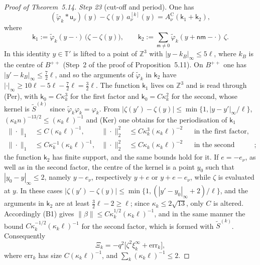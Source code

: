 \documentclass[11pt,letterpaper,reqno]{amsart}
\theoremstyle{definition}
\begin{document}
\begin{proof}[Proof of Theorem~5.14]
\emph{Step 23} (cut-off and period).
One has
\begin{equation*}
(\tilde\varphi_k*\mathsf u_\nu)(y)-\zeta(y)\,a^{[k]}_\nu(y)=A^{\mathrm C}_\nu(\mathsf k_1+\mathsf k_2),
\end{equation*}
where
\begin{equation*}
\mathsf k_1:=\tilde\varphi_k(y-\cdot)\,\bigl(\zeta-\zeta(y)\bigr),\qquad\mathsf k_2:=\sum_{\mathsf m\ne0}\tilde\varphi_k(y+\mathsf n\mathsf m-\cdot)\,\zeta.
\end{equation*}
In this identity $y\in\mathbb T'$ is lifted to a point of $\mathbb Z^3$ with $|y-k_B|_\infty\le5\ell$, where $k_B$ is the centre of $B^{++}$ (Step~2 of the proof of Proposition~5.11).
On $B^{++}$ one has $|y'-k_B|_\infty\le\frac72\ell$, and so the arguments of $\tilde\varphi_k$ in $\mathsf k_2$ have $|\cdot|_\infty\ge10\ell-5\ell-\frac72\ell=\frac32\ell$.
The function $\mathsf k_1$ lives on $\mathbb Z^3$ and is read through (Per), with $\mathsf k_0=C\kappa_k^3$ for the first factor and $\mathsf k_0=C\kappa_k^2$ for the second, whose kernel is $\tilde S^{(k)}$ since $\tilde\varphi_k\varphi_k=\varphi_k$.
From $|\zeta(y')-\zeta(y)|\le\min\{1,|y-y'|_\infty/\ell\}$, $(\kappa_kn)^{-13/2}\le(\kappa_k\ell)^{-1}$ and (Ker) one obtains for the periodisation of $\mathsf k_1$
\begin{align*}
\|\cdot\|_1&\le C(\kappa_k\ell)^{-1},&\|\cdot\|_2^2&\le C\kappa_k^3(\kappa_k\ell)^{-2}&&\text{in the first factor},\\
\|\cdot\|_1&\le C\kappa_k^{-1}(\kappa_k\ell)^{-1},&\|\cdot\|_2^2&\le C\kappa_k(\kappa_k\ell)^{-2}&&\text{in the second factor};
\end{align*}
the function $\mathsf k_2$ has finite support, and the same bounds hold for it.
If $e=-e_\nu$, as well as in the second factor, the centre of the kernel is a point $y_0$ such that $|y_0-y|_\infty\le2$, namely $y-e_\nu$, respectively $y+e$ or $y+e-e_\nu$, while $\zeta$ is evaluated at $y$.
In these cases $|\zeta(y')-\zeta(y)|\le\min\{1,(|y'-y_0|_\infty+2)/\ell\}$, and the arguments in $\mathsf k_2$ are at least $\frac32\ell-2\ge\ell$; since $\kappa_k\le2\sqrt{13}$, only $C$ is altered.
Accordingly (B1) gives $\|\beta\|\le C\kappa_k^{1/2}(\kappa_k\ell)^{-1}$, and in the same manner the bound $C\kappa_k^{-1/2}(\kappa_k\ell)^{-1}$ for the second factor, which is formed with $\tilde S^{(k)}$.
Consequently
\begin{equation*}
\Xi_k=-q^2\bigl[\zeta^2\xi_k^\infty+\mathrm{err}_k\bigr],
\end{equation*}
where $\mathrm{err}_k$ has size $C(\kappa_k\ell)^{-1}$, and $\sum_k(\kappa_k\ell)^{-1}\le2$.


\end{proof}
\end{document}
